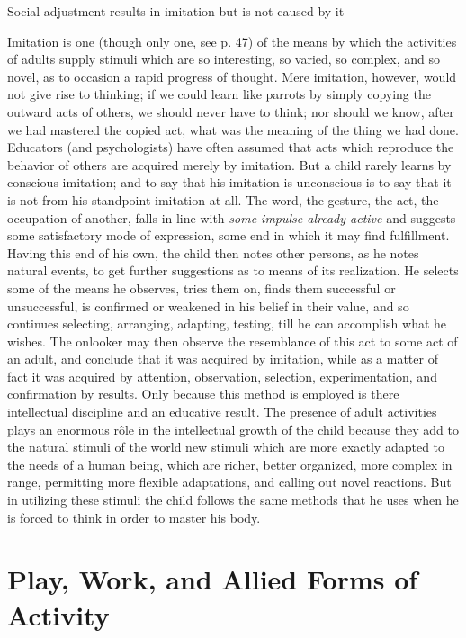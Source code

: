 \documentclass[letterpaper]{book}
\begin{document}
Social adjustment results in imitation but is not caused by it

Imitation is one (though only one, see p. 47) of the means by which the
activities of adults supply stimuli which are so interesting, so varied,
so complex, and so novel, as to occasion a rapid progress of thought.
Mere imitation, however, would not give rise to thinking; if we could
learn like parrots by simply copying the outward acts of others, we
should never have to think; nor should we know, after we had mastered
the copied act, what was the meaning of the thing we had done. Educators
(and psychologists) have often assumed that acts which reproduce the
behavior of others are acquired merely by imitation. But a child rarely
learns by conscious imitation; and to say that his imitation is
unconscious is to say that it is not from his standpoint imitation at
all. The word, the gesture, the act, the occupation of another, falls in
line with \emph{some impulse already active} and suggests some
satisfactory mode of expression, some end in which it may find
fulfillment. Having this end of his own, the child then notes other
persons, as he notes natural events, to get further suggestions as to
means of its realization. He selects some of the means he observes,
tries them on, finds them successful or unsuccessful, is confirmed or
weakened in his belief in their value, and so continues selecting,
arranging, adapting, testing, till he can accomplish what he wishes. The
onlooker may then observe the resemblance of this act to some act of an
adult, and conclude that it was acquired by imitation, while as a matter
of fact it was acquired by attention, observation, selection,
experimentation, and confirmation by results.
Only
because this method is employed is there intellectual discipline and an
educative result. The presence of adult activities plays an enormous
rôle in the intellectual growth of the child because they add to the
natural stimuli of the world new stimuli which are more exactly adapted
to the needs of a human being, which are richer, better organized, more
complex in range, permitting more flexible adaptations, and calling out
novel reactions. But in utilizing these stimuli the child follows the
same methods that he uses when he is forced to think in order to master
his body.

\section{Play, Work, and Allied Forms of Activity}
\end{document}
